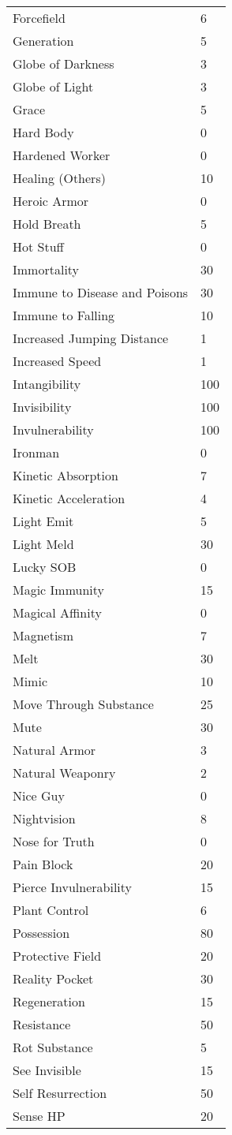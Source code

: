 \documentclass[twoside]{book}
\begin{document}
\begin{longtable}{p{1.25in}l}
      \raggedright Forcefield & 6 \tabularnewline
      \raggedright Generation & 5 \tabularnewline
      \raggedright Globe of Darkness & 3 \tabularnewline
      \raggedright Globe of Light & 3 \tabularnewline
      \raggedright Grace & 5 \tabularnewline
      \raggedright Hard Body & 0 \tabularnewline
      \raggedright Hardened Worker & 0 \tabularnewline
      \raggedright Healing (Others) & 10 \tabularnewline
      \raggedright Heroic Armor & 0 \tabularnewline
      \raggedright Hold Breath & 5 \tabularnewline
      \raggedright Hot Stuff & 0 \tabularnewline
      \raggedright Immortality & 30 \tabularnewline
      \raggedright Immune to Disease and Poisons
           & 30 \tabularnewline
      \raggedright Immune to Falling & 10 \tabularnewline
      \raggedright Increased Jumping Distance
           & 1 \tabularnewline
      \raggedright Increased Speed & 1 \tabularnewline
      \raggedright Intangibility & 100 \tabularnewline
      \raggedright Invisibility & 100 \tabularnewline
      \raggedright Invulnerability & 100 \tabularnewline
      \raggedright Ironman & 0 \tabularnewline
      \raggedright Kinetic Absorption & 7 \tabularnewline
      \raggedright Kinetic Acceleration & 4 \tabularnewline
      \raggedright Light Emit & 5 \tabularnewline
      \raggedright Light Meld & 30 \tabularnewline
      \raggedright Lucky SOB & 0 \tabularnewline
      \raggedright Magic Immunity & 15 \tabularnewline
      \raggedright Magical Affinity & 0 \tabularnewline
      \raggedright Magnetism & 7 \tabularnewline
      \raggedright Melt & 30 \tabularnewline
      \raggedright Mimic & 10 \tabularnewline
      \raggedright Move Through Substance & 25 \tabularnewline
      \raggedright Mute & 30 \tabularnewline
      \raggedright Natural Armor & 3 \tabularnewline
      \raggedright Natural Weaponry & 2 \tabularnewline
      \raggedright Nice Guy & 0 \tabularnewline
      \raggedright Nightvision & 8 \tabularnewline
      \raggedright Nose for Truth & 0 \tabularnewline
      \raggedright Pain Block & 20 \tabularnewline
      \raggedright Pierce Invulnerability & 15 \tabularnewline
      \raggedright Plant Control & 6 \tabularnewline
      \raggedright Possession & 80 \tabularnewline
      \raggedright Protective Field & 20 \tabularnewline
      \raggedright Reality Pocket & 30 \tabularnewline
      \raggedright Regeneration & 15 \tabularnewline
      \raggedright Resistance & 50 \tabularnewline
      \raggedright Rot Substance & 5 \tabularnewline
      \raggedright See Invisible & 15 \tabularnewline
      \raggedright Self Resurrection & 50 \tabularnewline
      \raggedright Sense HP & 20 \tabularnewline

\end{longtable}
\end{document}
